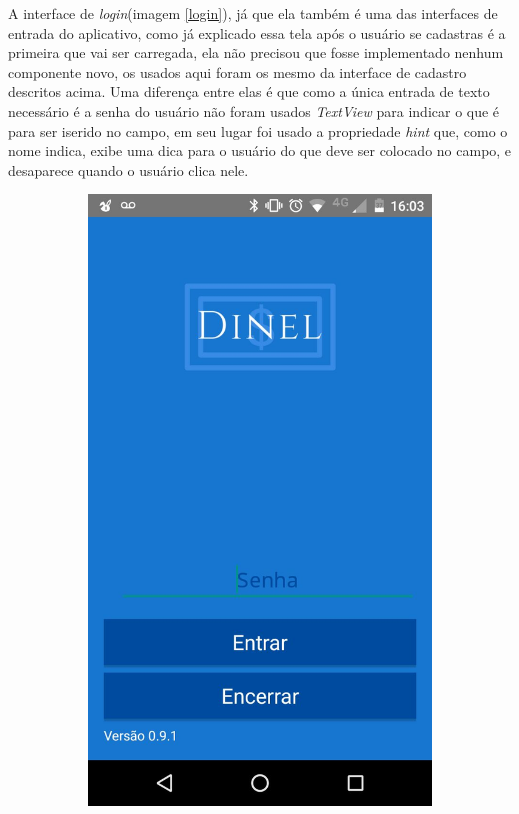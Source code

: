 \documentclass[hidelinks,12pt]{article}
\begin{document}
A interface de \textit{login}(imagem \ref{login}), j\'a que ela tamb\'em \'e uma das interfaces de entrada do aplicativo, como já explicado essa tela ap\'os o usu\'ario se cadastras \'e a primeira que vai ser carregada, ela n\~ao precisou que fosse implementado nenhum componente novo, os usados aqui foram os mesmo da interface de cadastro descritos acima. Uma diferen\c{c}a entre elas \'e que como a \'unica entrada de texto necess\'ario \'e a senha do usu\'ario n\~ao foram usados \textit{TextView} para indicar o que \'e para ser iserido no campo, em seu lugar foi usado a propriedade \textit{hint} que, como o nome indica, exibe uma dica para o usu\'ario do que deve ser colocado no campo, e desaparece quando o usu\'ario clica nele.
\begin{figure}[H]
	\begin{subfigure}{0.5\textwidth}
		\includegraphics[scale=0.3]{login} 

\end{subfigure}
\end{figure}
\end{document}
